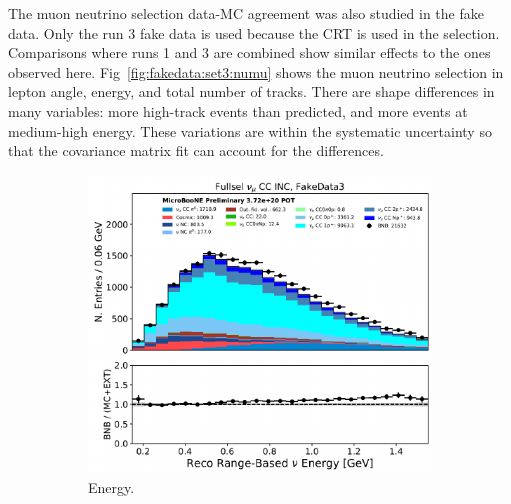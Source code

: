 The muon neutrino selection data-MC agreement was also studied in the fake data.  Only the run 3 fake data is used because the CRT is used in the selection. Comparisons where runs 1 and 3 are combined show similar effects to the ones observed here. 
Fig~\ref{fig:fakedata:set3:numu} shows the muon neutrino selection in lepton angle, energy, and total number of tracks. There are shape differences in many variables: more high-track events than predicted, and more events at medium-high energy.  These variations are within the systematic uncertainty so that the covariance matrix fit can account for the differences.

\begin{figure}[H] 
\begin{center}
    \begin{subfigure}[b]{0.3\textwidth}
    \centering
    \includegraphics[width=1.00\textwidth]{Fakedata/set3/numu_energy.pdf}
    \caption{\label{fig:fakedata:set3:numu_energy} Energy.}
    \end{subfigure}
    \begin{subfigure}[b]{0.3\textwidth}
    \centering

\end{subfigure}
\end{center}
\end{figure}
